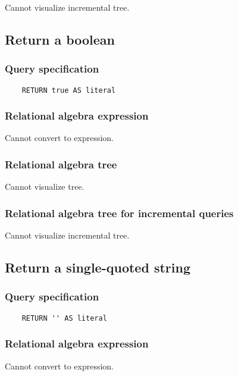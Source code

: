 	Cannot visualize incremental tree.
	\subsection{Return a boolean}

	\subsubsection*{Query specification}

	\begin{lstlisting}
	RETURN true AS literal
	\end{lstlisting}


	\subsubsection*{Relational algebra expression}

	Cannot convert to expression.

	\subsubsection*{Relational algebra tree}

	Cannot visualize tree.

	\subsubsection*{Relational algebra tree for incremental queries}

	Cannot visualize incremental tree.
	\subsection{Return a single-quoted string}

	\subsubsection*{Query specification}

	\begin{lstlisting}
	RETURN '' AS literal
	\end{lstlisting}


	\subsubsection*{Relational algebra expression}

	Cannot convert to expression.

